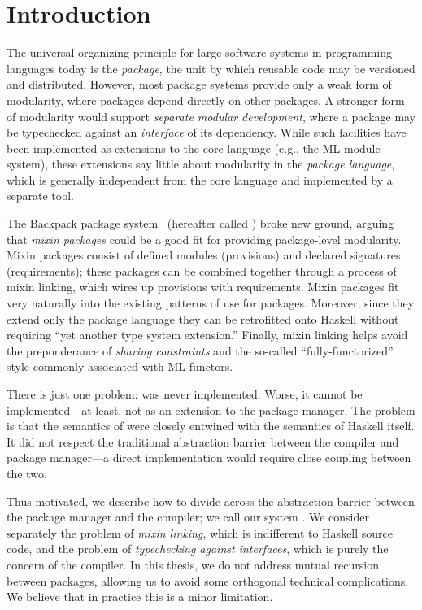 \chapter{Introduction}

The universal organizing principle for large software systems in
programming languages today is the \emph{package}, the unit by which
reusable code may be versioned and distributed.  However, most package systems
provide only a weak form of modularity, where packages depend directly
on other packages.  A stronger form of modularity would
support \emph{separate modular development}, where a package may be
typechecked against an \emph{interface} of its dependency.  While
such facilities have been implemented as extensions to the core
language (e.g., the ML module system), these extensions say little
about modularity in the \emph{package language}, which is generally
independent from the core language and implemented by a separate tool.

The Backpack package system~\cite{backpack}
(hereafter called \OldBackpack{}) broke new ground, arguing that \emph{mixin
packages} could be a good fit for providing package-level modularity.
Mixin packages consist of defined modules (provisions) and declared
signatures (requirements); these packages can be combined together
through a process of mixin linking, which wires up provisions with
requirements.  Mixin packages fit very naturally into the existing
patterns of use for packages. Moreover, since they extend only the package
language they can be retrofitted onto Haskell without requiring ``yet
another type system extension.''  Finally, mixin linking helps avoid the
preponderance of \emph{sharing constraints}
and the so-called ``fully-functorized'' style commonly associated with
ML functors.

There is just one problem: \OldBackpack{} was never implemented.  Worse, it
cannot be implemented---at least, not as an extension to the package
manager.  The problem is that the semantics of \OldBackpack{} were closely entwined
with the semantics of Haskell itself. It did not respect the
traditional abstraction barrier between the compiler and package
manager---a direct implementation would require close coupling between
the two.

Thus motivated, we describe how to divide
\OldBackpack{} across the abstraction barrier between the package manager and
the compiler; we call our system \Backpack{}.  We consider separately the problem of
\emph{mixin linking}, which is indifferent to Haskell source code, and
the problem of \emph{typechecking against interfaces}, which is purely
the concern of the compiler.  In this thesis, we do not address
mutual recursion between packages, allowing us to avoid some orthogonal
technical complications. We believe that in practice this is a minor
limitation.


